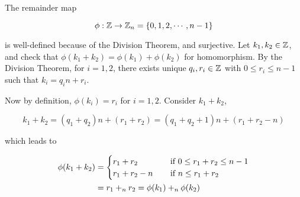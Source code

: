 \documentclass[a4paper,12pt]{article}
\begin{document}
\begin{exm}
  The remainder map

  $$\phi:\mathbb{Z}\to\mathbb{Z}_{n}=\left\{ 0,1,2,\cdots,n-1\right\}$$\s

  is well-defined because of the Division Theorem, and surjective. Let $k_{1},k_{2}\in\mathbb{Z}$, and check that $\phi(k_{1}+k_{2})=\phi(k_{1})+\phi(k_{2})$ for homomorphism. By the Division Theorem, for $i=1,2$, there exists unique $q_{i},r_{i}\in\mathbb{Z}$ with $0\leq r_{i}\leq n-1$ such that $k_{i}=q_{i}n+r_{i}$.\n

  Now by definition, $\phi(k_{i})=r_{i}$ for $i=1,2$. Consider $k_{1}+k_{2}$,

  $$k_{1}+k_{2}=(q_{1}+q_{2})n+(r_{1}+r_{2})=(q_{1}+q_{2}+1)n+(r_{1}+r_{2}-n)$$\s

  which leads to

  $$\begin{aligned}[t]
    \phi(k_{1}+k_{2})&=\begin{cases}
      r_{1}+r_{2}&\;\;\;\;\text{if }0\leq r_{1}+r_{2}\leq n-1\\
      r_{1}+r_{2}-n&\;\;\;\;\text{if }n\leq r_{1}+r_{2}
    \end{cases}\\
    &=r_{1}+_{n}r_{2}=\phi(k_{1})+_{n}\phi(k_{2})
  \end{aligned}$$
\end{exm}\n
\end{document}
